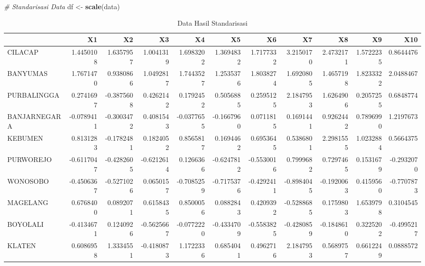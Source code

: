 \documentclass[
  oneside]{book}
\newenvironment{Shaded}{\begin{snugshade}}{\end{snugshade}}
\newcommand{\CommentTok}[1]{\textcolor[rgb]{0.56,0.35,0.01}{\textit{#1}}}
\newcommand{\FunctionTok}[1]{\textcolor[rgb]{0.13,0.29,0.53}{\textbf{#1}}}
\newcommand{\NormalTok}[1]{#1}
\newcommand{\OtherTok}[1]{\textcolor[rgb]{0.56,0.35,0.01}{#1}}
\begin{document}
\begin{Shaded}
\begin{Highlighting}[]
\CommentTok{\# Standarisasi Data}
\NormalTok{df }\OtherTok{\textless{}{-}} \FunctionTok{scale}\NormalTok{(data)}
\end{Highlighting}
\end{Shaded}

\begin{table}

\caption{\label{tab:nice-tab-1}Data Hasil Standarisasi}
\centering
\begin{tabular}[t]{lrrrrrrrrrr}
\toprule
  & X1 & X2 & X3 & X4 & X5 & X6 & X7 & X8 & X9 & X10\\
\midrule
CILACAP & 1.4450108 & 1.6357957 & 1.0041319 & 1.6983202 & 1.3694832 & 1.7177332 & 3.2150170 & 2.4732171 & 1.5722235 & 0.8644476\\
BANYUMAS & 1.7671470 & 0.9380866 & 1.0492817 & 1.7443527 & 1.2535376 & 1.8038274 & 1.6920805 & 1.4657198 & 1.8233322 & 2.0488467\\
PURBALINGGA & 0.2741697 & -0.3875608 & 0.4262142 & 0.1792452 & 0.5056885 & 0.2595125 & 2.1847953 & 1.6264906 & 0.2057255 & 0.6848774\\
BANJARNEGARA & -0.0789411 & -0.3003472 & 0.4081543 & -0.0377655 & -0.1667960 & 0.0711815 & 0.1691441 & 0.9262442 & 0.7896990 & 1.2197673\\
KEBUMEN & 0.8131283 & -0.1782481 & 0.1824052 & 0.8565817 & 0.1694462 & 0.6953645 & 0.5386801 & 2.2981555 & 1.0232884 & 0.5664375\\
\addlinespace
PURWOREJO & -0.6117047 & -0.4282605 & -0.6212614 & 0.1266366 & -0.6247812 & -0.5530016 & 0.7999682 & 0.7297465 & 0.1531679 & -0.2932070\\
WONOSOBO & -0.4506367 & -0.5271026 & 0.0650157 & -0.7085259 & -0.7175376 & -0.4292411 & -0.8984045 & -0.1920063 & 0.4159560 & -0.7707873\\
MAGELANG & 0.6768400 & 0.0892071 & 0.6158435 & 0.8500056 & 0.0882843 & 0.4209392 & -0.5288685 & 0.1759803 & 1.6539798 & 0.3104545\\
BOYOLALI & -0.4134671 & 0.1240926 & -0.5625667 & -0.0772220 & -0.4334709 & -0.5583825 & -0.4280859 & -0.1848610 & 0.3225202 & -0.4995217\\
KLATEN & 0.6086958 & 1.3334551 & -0.4180873 & 1.1722336 & 0.6854041 & 0.4962716 & 2.1847953 & 0.5689757 & 0.6612249 & 0.0888572\\
\bottomrule
\end{tabular}
\end{table}
\end{document}
